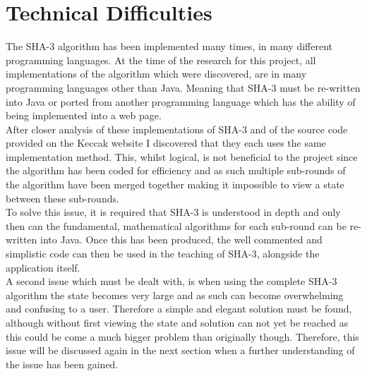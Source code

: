 \section{Technical Difficulties}
The SHA-3 algorithm has been implemented many times, in many different programming languages. At the time of the research for this project, all implementations of the algorithm which were discovered, are in many programming languages other than Java. Meaning that SHA-3 must be re-written into Java or ported from another programming language which has the ability of being implemented into a web page. 
\vspace{5 mm}\\
After closer analysis of these implementations of SHA-3 and of the source code provided on the Keccak website\cite{KeccakSite} I discovered that they each uses the same implementation method. This, whilst logical, is not beneficial to the project since the algorithm has been coded for efficiency and as such multiple sub-rounds of the algorithm have been merged together making it impossible to view a state between these sub-rounds.
\vspace{5 mm}\\
To solve this issue, it is required that SHA-3 is understood in depth and only then can the fundamental, mathematical algorithms for each sub-round can be re-written into Java. Once this has been produced, the well commented and simplistic code can then be used in the teaching of SHA-3, alongside the application itself.
\vspace{5 mm}\\
A second issue which must be dealt with, is when using the complete SHA-3 algorithm the state becomes very large and as such can become overwhelming and confusing to a user. Therefore a simple and elegant solution must be found, although without first viewing the state and solution can not yet be reached as this could be come a much bigger problem than originally though. Therefore, this issue will be discussed again in the next section when a further understanding of the issue has been gained.